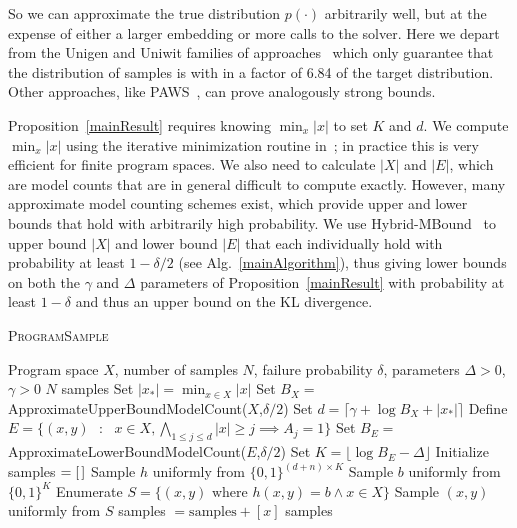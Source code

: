 \documentclass{article}
\newcommand{\theSystem}{\textsc{ProgramSample}}
\begin{document}
  So we can approximate the true distribution $p(\cdot )$ arbitrarily well, but at the expense of either a larger embedding or more calls to the solver.
  Here we depart from the Unigen and Uniwit families of approaches~\cite{chakraborty2014distribution,chakraborty2014balancing} which only guarantee that the distribution of samples is with in a factor of 6.84 of the target distribution.
  Other approaches, like PAWS~\cite{ermon2013embed}, can prove analogously strong bounds.

  Proposition~\ref{mainResult} requires knowing $\min_x \lvert x \rvert $ to set $K$ and $d$. We compute $\min_x \lvert x \rvert $ using the iterative minimization routine in~\cite{singh2013automated}; in practice this is very efficient for finite program spaces. We also need to calculate $|X|$ and $|E|$, which are model counts that are in general difficult to compute exactly.
  However, many approximate model counting schemes exist, which provide upper and lower bounds that hold with arbitrarily high probability.
  We use Hybrid-MBound~\cite{gomes2006model} to upper bound $|X|$ and lower bound $|E|$ that each individually hold with probability at least $1-\delta / 2$ (see Alg.~\ref{mainAlgorithm}), thus
  giving lower bounds on both the $\gamma$ and $\Delta$ parameters of Proposition~\ref{mainResult} with probability at least $1-\delta$
  and thus an upper bound on the KL divergence. 

   
  \begin{algorithm}[tb]
   \caption{\theSystem{}}
   \label{mainAlgorithm}
\begin{algorithmic}
   Program space $X$, number of samples $N$, failure probability $\delta$, parameters $\Delta > 0$, $\gamma > 0$
   $N$ samples 
  \STATE Set $\lvert x_* \rvert  = \min_{x\in X} \lvert x \rvert $
  \STATE Set $B_X = $ ApproximateUpperBoundModelCount($X$,$\delta/2$)
  \STATE Set $d = \lceil \gamma + \log B_X + |x_* |\rceil$
  \STATE Define $E = \{(x,y) \text{ }:\text{ } x\in X,  \bigwedge_{1\leq j \leq d}  \lvert x \rvert \geq j\implies A_j=1 \}$
  \STATE Set $B_E = $ ApproximateLowerBoundModelCount($E$,$\delta/2$)
  \STATE Set $K = \lfloor \log B_E - \Delta \rfloor $
  \STATE Initialize samples $ = [\hspace{0.05cm}]$
  \REPEAT
  \STATE Sample $h$ uniformly from $\{0,1\}^{(d+n)\times K}$
  \STATE Sample $b$ uniformly from $\{0,1\}^{K}$
  \STATE Enumerate $S = \{ (x,y) \text{ where } h(x,y) = b \wedge x\in X\}$
  \STATE Sample $(x,y)$ uniformly from $S$
  \STATE samples $ = \text{samples}+ [x]$
  \ENDIF
   \ENDIF
    samples
\end{algorithmic}
  \end{algorithm}
\end{document}
